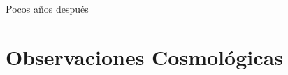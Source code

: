 Pocos años después	








\section{Observaciones Cosmológicas}
\label{sec:CosmologicalObservations}
	


